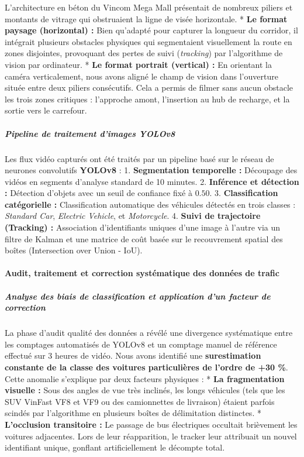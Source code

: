 \documentclass[10pt, a4paper]{article}
\begin{document}
L'architecture en béton du Vincom Mega Mall présentait de nombreux
piliers et montants de vitrage qui obstruaient la ligne de visée
horizontale. * \textbf{Le format paysage (horizontal) :} Bien qu'adapté
pour capturer la longueur du corridor, il intégrait plusieurs obstacles
physiques qui segmentaient visuellement la route en zones disjointes,
provoquant des pertes de suivi (\emph{tracking}) par l'algorithme de
vision par ordinateur. * \textbf{Le format portrait (vertical) :} En
orientant la caméra verticalement, nous avons aligné le champ de vision
dans l'ouverture située entre deux piliers consécutifs. Cela a permis de
filmer sans aucun obstacle les trois zones critiques : l'approche amont,
l'insertion au hub de recharge, et la sortie vers le carrefour.

\subparagraph{Pipeline de traitement d'images
YOLOv8}\label{pipeline-de-traitement-dimages-yolov8}

Les flux vidéo capturés ont été traités par un pipeline basé sur le
réseau de neurones convolutifs \textbf{YOLOv8} : 1. \textbf{Segmentation
temporelle :} Découpage des vidéos en segments d'analyse standard de 10
minutes. 2. \textbf{Inférence et détection :} Détection d'objets avec un
seuil de confiance fixé à \(0.50\). 3. \textbf{Classification
catégorielle :} Classification automatique des véhicules détectés en
trois classes : \emph{Standard Car}, \emph{Electric Vehicle}, et
\emph{Motorcycle}. 4. \textbf{Suivi de trajectoire (Tracking) :}
Association d'identifiants uniques d'une image à l'autre via un filtre
de Kalman et une matrice de coût basée sur le recouvrement spatial des
boîtes (Intersection over Union - IoU).

\paragraph{Audit, traitement et correction systématique des données de
trafic}\label{audit-traitement-et-correction-systuxe9matique-des-donnuxe9es-de-trafic}

\subparagraph{Analyse des biais de classification et application d'un
facteur de
correction}\label{analyse-des-biais-de-classification-et-application-dun-facteur-de-correction}

La phase d'audit qualité des données a révélé une divergence
systématique entre les comptages automatisés de YOLOv8 et un comptage
manuel de référence effectué sur 3 heures de vidéo. Nous avons identifié
une \textbf{surestimation constante de la classe des voitures
particulières de l'ordre de +30 \%}. Cette anomalie s'explique par deux
facteurs physiques : * \textbf{La fragmentation visuelle :} Sous des
angles de vue très inclinés, les longs véhicules (tels que les SUV
VinFast VF8 et VF9 ou des camionnettes de livraison) étaient parfois
scindés par l'algorithme en plusieurs boîtes de délimitation distinctes.
* \textbf{L'occlusion transitoire :} Le passage de bus électriques
occultait brièvement les voitures adjacentes. Lors de leur réapparition,
le tracker leur attribuait un nouvel identifiant unique, gonflant
artificiellement le décompte total.
\end{document}
